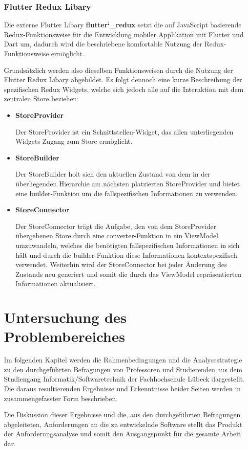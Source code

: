 \documentclass[bibliography=totoc,listof=totoc,BCOR=5mm,DIV=12,oneside]{scrbook}
\begin{document}
\subsection{Flutter Redux Libary}
\par Die externe Flutter Libary \textbf{flutter\char`_redux}\citep{FlutterReduxLib} setzt die auf JavaScript basierende Redux-Funktionsweise für die Entwicklung mobiler Applikation mit Flutter und Dart um, dadurch wird die beschriebene komfortable Nutzung der Redux-Funktionsweise ermöglicht.

\par \bigskip Grundsätzlich werden also dieselben Funktionsweisen durch die Nutzung der Flutter Redux Libary abgebildet. Es folgt dennoch eine kurze Beschreibung der spezifischen Redux Widgets, welche sich jedoch alle auf die Interaktion mit dem zentralen Store beziehen:

\begin{itemize}
\item \textbf{StoreProvider}
\par Der StoreProvider ist ein Schnittstellen-Widget, das allen unterliegenden Widgets Zugang zum Store ermöglicht.
\item \textbf{StoreBuilder}
\par Der StoreBuilder holt sich den aktuellen Zustand von dem in der überliegenden Hierarchie am nächsten platzierten StoreProvider und bietet eine builder-Funktion um die fallspezifischen Informationen zu verwenden.
\item \textbf{StoreConnector}
\par Der StoreConnector trägt die Aufgabe, den von dem StoreProvider übergebenen Store durch eine converter-Funktion in ein ViewModel umzuwandeln, welches die benötigten fallspezifischen Informationen in sich hält und durch die builder-Funktion diese Informationen kontextspezifisch verwendet. Weiterhin wird der StoreConnector bei jeder Änderung des Zustands neu generiert und somit die durch das ViewModel repräsentierten Informationen aktualisiert.
\end{itemize}

\newpage
\chapter{Untersuchung des Problembereiches} \label{chap:problemanalyse}
\par Im folgenden Kapitel werden die Rahmenbedingungen und die Analysestrategie zu den durchgeführten Befragungen von Professoren und Studierenden aus dem Studiengang Informatik/Softwaretechnik der Fachhochschule Lübeck dargestellt. Die daraus resultierenden Ergebnisse und Erkenntnisse beider Seiten werden in zusammengefasster Form beschrieben. 
\par Die Diskussion dieser Ergebnisse und die, aus den durchgeführten Befragungen abgeleiteten, Anforderungen an die zu entwickelnde Software stellt das Produkt der Anforderungsanalyse und somit den Ausgangspunkt für die gesamte Arbeit dar.
\end{document}
